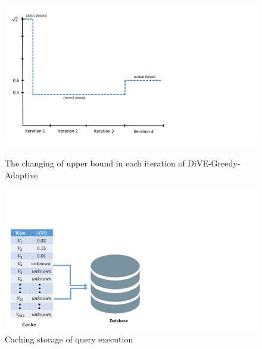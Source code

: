 \documentclass{article}
\begin{document}
\begin{figure}
	\centering
	\begin{minipage}{0.45\textwidth}
		\centering
		\includegraphics[width=1.5\textwidth]{figures/Rectifying_flow_graph} %
		\caption{The changing of upper bound in each iteration of DiVE-Greedy-Adaptive}
		\label{fig:rectify_logic_graph}
	\end{minipage}\hfill
	\begin{minipage}{0.45\textwidth}
		\centering
		\includegraphics[width=1.5\textwidth]{figures/cache} %
		\caption{Caching storage of query execution}
		\label{fig:cache}
	\end{minipage}
	
\end{figure}
\end{document}

